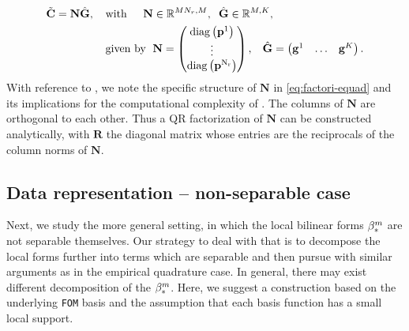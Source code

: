 \documentclass[onefignum,onetabnum]{siamart251104}
\newcommand{\bv}[1]{{\mathbf #1}}
\newcommand{\bt}[1]{{\mathbf{#1}}}
\newcommand{\Nr}{{N_r}}
\newcommand{\R}{\mathbb{R}}
\newcommand{\tAlg}{{\bv{p}}}
\newcommand{\acro}[1]{{\texttt{#1}}}  %
\newcommand{\Cp}{{\bt{C}}}
\newcommand{\mydiag}{\rm{diag}}
\begin{document}
{\small
\begin{align}
\begin{split} \label{eq:factori-equad}
\tilde{\Cp} = \bt{N} \hat{\bt{G}}, 
\hspace{0.4cm} & \text{with } \hspace{0.4cm}  \bt{N} \in \R^{M \Nr,M}, \hspace{0.2cm}  \hat{\bt{G}} \in \R^{M,K},\\
& \text{given by }\hspace{0.1cm}  \bt{N} = 
\begin{pmatrix}
	\mydiag\left(\tAlg^1\right) \\
	\vdots \\
	\mydiag\left(\tAlg^{\Nr}\right)
\end{pmatrix}, \hspace{0.3cm}
\hat{\bt{G}} = 
\begin{pmatrix}
\bv{g}^1 & \ldots & \bv{g}^K  
\end{pmatrix} .
\end{split}
\end{align}
}%
With reference to , we note the specific structure of ${\bt{N}}$ in \eqref{eq:factori-equad} and its implications for the computational complexity of . The columns of $\bt{N}$ are orthogonal to each other. Thus a QR factorization of $\bt{N}$ can be constructed analytically, with $\bt{R}$ the diagonal matrix whose entries are the reciprocals of the column norms of $\bt{N}$.

\subsection{Data representation -- non-separable case} \label{subsec:separatedData-gen}
Next, we study the more general setting, in which the local bilinear forms $\beta_{\rm{*}}^m$ are not separable themselves. Our strategy to deal with that is to decompose the local forms further into terms which are separable and then pursue with similar arguments as in the empirical quadrature case. In general, there may exist different decomposition of the $\beta_{\rm{*}}^m$. Here, we suggest a construction based on the underlying \acro{FOM} basis and the assumption that each basis function has a small local support.
\end{document}
